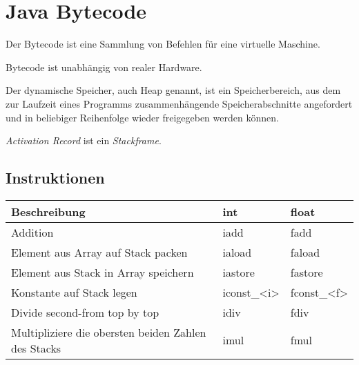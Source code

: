 \chapter{Java Bytecode}
\begin{definition}[Bytecode]%
    Der Bytecode ist eine Sammlung von Befehlen für eine virtuelle Maschine.
\end{definition}

Bytecode ist unabhängig von realer Hardware.

\begin{definition}[Heap]%
    Der dynamische Speicher, auch Heap genannt, ist ein Speicherbereich, aus dem
    zur Laufzeit eines Programms zusammenhängende Speicherabschnitte angefordert
    und in beliebiger Reihenfolge wieder freigegeben werden können.
\end{definition}

\textit{Activation Record} ist ein \textit{Stackframe}.
\section{Instruktionen}
\begin{table}[h]
    \begin{tabular}{p{6cm}|ll}
    \textbf{Beschreibung}                               & \textbf{int} & \textbf{float} \\ \hline
    Addition                                            & iadd         & fadd           \\
    Element aus Array auf Stack packen                  & iaload       & faload         \\
    Element aus Stack in Array speichern                & iastore      & fastore        \\
    Konstante auf Stack legen                           & iconst\_<i>  & fconst\_<f> \\
    Divide second-from top by top                       & idiv         & fdiv           \\
    Multipliziere die obersten beiden Zahlen des Stacks & imul         & fmul           \\
    \end{tabular}
\end{table}

